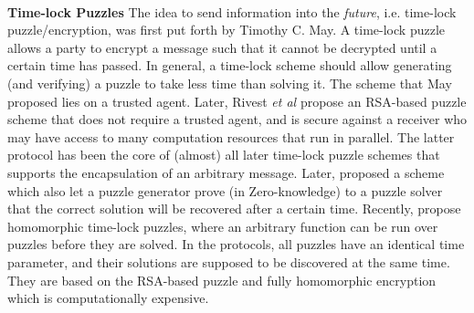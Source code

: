 

\

\noindent\textbf{Time-lock Puzzles}
The idea to send information into the \emph{future}, i.e.
time-lock puzzle/encryption, was first put forth by Timothy C. May. A time-lock puzzle allows a party to encrypt a message such that it cannot be decrypted  until a certain  time has passed. In general,  a  time-lock scheme should allow   generating (and verifying) a puzzle to take less time than solving it. The  scheme that May proposed lies on a trusted agent. Later, Rivest \textit{et al} \cite{Rivest:1996:TPT:888615} propose an RSA-based puzzle scheme that does not require a trusted agent, and is secure against a receiver
who may have access to many  computation resources that run in parallel. The latter protocol has been the core of (almost) all later time-lock puzzle schemes that supports the encapsulation of an arbitrary message. Later, \cite{BonehN00,DBLP:conf/fc/GarayJ02} proposed a scheme which also let a puzzle generator  prove (in Zero-knowledge)  to a puzzle solver that the correct solution  will be recovered after a certain time.    Recently, \cite{MalavoltaT19,BrakerskiDGM19}  propose  homomorphic time-lock puzzles, where an arbitrary function can be run over puzzles before they are solved. In the protocols, all puzzles have an identical time parameter, and their solutions are supposed to be discovered at the same time. They  are based on the RSA-based puzzle  and   fully homomorphic encryption which is computationally expensive.




